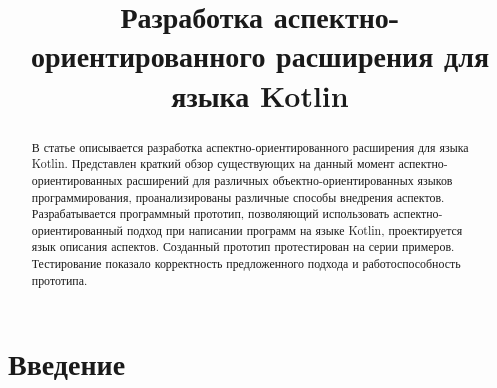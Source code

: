 \documentclass[conference]{IEEEtran}
\begin{document}
%
%
\title{Разработка аспектно-ориентированного расширения для языка Kotlin}


\author{
\and
{}
}

\maketitle

\begin{abstract}

В статье описывается разработка аспектно-ориентированного расширения для языка
Kotlin.
Представлен краткий обзор существующих на данный момент аспектно-ориентированных
расширений для различных объектно-ориентированных языков программирования,
проанализированы различные способы внедрения аспектов.
Разрабатывается программный прототип, позволяющий использовать
аспектно-ориентированный подход при написании программ на языке Kotlin,
проектируется язык описания аспектов.
Созданный прототип протестирован на серии примеров.
Тестирование показало корректность предложенного подхода и работоспособность
прототипа.
\end{abstract}

\section{Введение}
\end{document}
